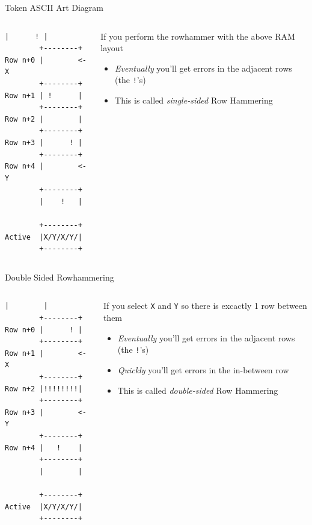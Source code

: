 \documentclass[9pt,aspectratio=169]{beamer}
\begin{document}
\begin{frame}[label={sec:org0e76267},fragile]{Token ASCII Art Diagram}
 \begin{columns}
\begin{column}[t]{0.3\columnwidth}
\begin{lstlisting}[language=text,numbers=none]
        |      ! |
        +--------+
Row n+0 |        <- X
        +--------+
Row n+1 | !      |
        +--------+
Row n+2 |        | 
        +--------+
Row n+3 |      ! | 
        +--------+
Row n+4 |        <- Y
        +--------+
        |    !   |

        +--------+
Active  |X/Y/X/Y/|
        +--------+
\end{lstlisting}
\end{column}

\begin{column}[t]{0.69\columnwidth}
If you perform the rowhammer with the above RAM layout
\begin{itemize}
\item \emph{Eventually} you'll get errors in the adjacent rows (the \texttt{!}'s)
\item This is called \emph{single-sided} Row Hammering
\end{itemize}
\end{column}
\end{columns}
\end{frame}

\begin{frame}[label={sec:org5ccc044},fragile]{Double Sided Rowhammering}
 \begin{columns}
\begin{column}[t]{0.3\columnwidth}
\begin{lstlisting}[language=text,numbers=none]
        |        |
        +--------+
Row n+0 |      ! |
        +--------+
Row n+1 |        <- X
        +--------+
Row n+2 |!!!!!!!!| 
        +--------+
Row n+3 |        <- Y 
        +--------+
Row n+4 |   !    |   
        +--------+
        |        |

        +--------+
Active  |X/Y/X/Y/|
        +--------+
\end{lstlisting}
\end{column}

\begin{column}[t]{0.69\columnwidth}
If you select \texttt{X} and \texttt{Y} so there is excactly 1 row between them
\begin{itemize}
\item \emph{Eventually} you'll get errors in the adjacent rows (the \texttt{!}'s)
\item \emph{Quickly} you'll get errors in the in-between row
\item This is called \emph{double-sided} Row Hammering
\end{itemize}
\end{column}
\end{columns}
\end{frame}
\end{document}
